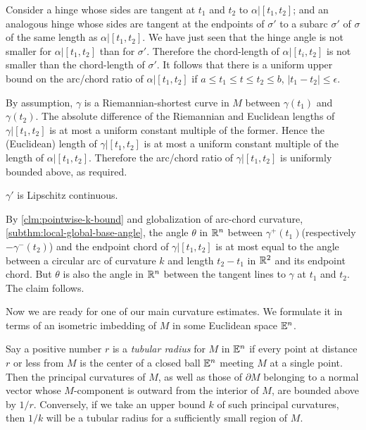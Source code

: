Consider a hinge whose sides are tangent  at $t_1$ and $t_2$ to $\alpha|[t_1,t_2]$; and an analogous hinge whose sides are tangent  at the endpoints of $\sigma'$ to a subarc $\sigma'$ of $\sigma$ of the same length as $\alpha|[t_1,t_2]$.  We have just seen that the hinge angle is not smaller for $\alpha|[t_1,t_2]$ than for $\sigma'$.  Therefore the 
chord-length of $\alpha|[t_i,t_2]$ is not smaller than  the chord-length of $\sigma'$.  It follows that there is a uniform upper bound on the arc/chord ratio of $\alpha|[t_1,t_2]$ if   $a\le t_1\le t\le t_2\le b$, $|t_1-t_2|\le \epsilon$.

By assumption, $\gamma$ is a Riemannian-shortest curve in $M$ between $\gamma(t_1)$ and $\gamma(t_2)$. The absolute difference of the Riemannian and Euclidean lengths of $\gamma|[t_1,t_2]$ 
 is at most a uniform constant multiple of the former. Hence the (Euclidean) length of $\gamma|[t_1,t_2]$
  is at most a uniform constant  multiple of the length of $\alpha|[t_1,t_2]$.   Therefore the arc/chord ratio of $\gamma|[t_1,t_2]$ is uniformly bounded above, as required.

\begin{clm}{}\label{clm:global-k-bound}$\gamma'$ is Lipschitz continuous. 
\end{clm}
By \ref{clm:pointwise-k-bound} and globalization of arc-chord curvature, 
\ref{subthm:local-global-base-angle}, the angle $\theta$ in $\mathbb{R}^n$ between $\gamma^+(t_1)$(respectively $-\gamma^-(t_2)$)  and the endpoint chord of $\gamma|[t_1,t_2]$ is at most equal to the angle between a circular arc of curvature $k$ and length $t_2-t_1$  in $\mathbb{R}^2$ and  its endpoint chord.  But $\theta$ is also the angle in $\mathbb{R}^n$ between the tangent lines to $\gamma$ at $t_1$ and $t_2$.  The claim follows.
\qeds

Now we are ready for one of our main curvature estimates. We formulate it in terms of an 
isometric imbedding of $M$ in some Euclidean space $\mathbb{E}^n$. 

Say a positive number $r$ is a \emph{tubular
radius} for $M$ in $\mathbb{E}^n$ if every point at distance $r$ or less from $M$ is the center of a
closed ball $\mathbb{E}^n$ meeting $M$ at a single point. Then the principal curvatures of $M$, as well as  those of $\partial M$ belonging to a normal
vector whose $M$-component is outward from the interior of $M$, are bounded
above by $1/r$. Conversely, if we take an upper bound $k$ of such principal
curvatures, then
$1/k$ will be a tubular radius for a sufficiently small region of $M$.



